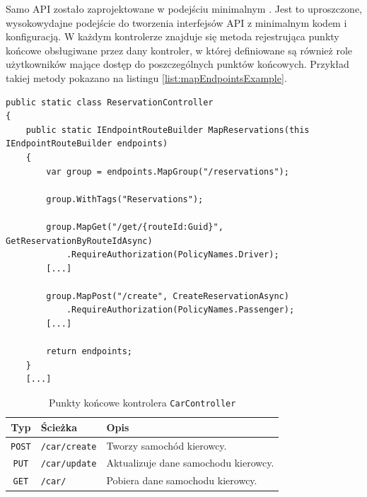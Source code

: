 Samo API zostało zaprojektowane w podejściu minimalnym \cite{MS_APIS}. 
Jest to uproszczone, wysokowydajne podejście do tworzenia interfejsów API z minimalnym kodem i konfiguracją.
W każdym kontrolerze znajduje się metoda rejestrująca punkty końcowe obsługiwane przez dany kontroler, w której definiowane są również role użytkowników mające dostęp do poszczególnych punktów końcowych.
Przykład takiej metody pokazano na listingu \ref{list:mapEndpointsExample}.

\begin{lstlisting}[label=list:mapEndpointsExample,caption=Przykład rejestracji punktów końcowych,style=sharpcstyle]
public static class ReservationController
{
    public static IEndpointRouteBuilder MapReservations(this IEndpointRouteBuilder endpoints)
    {
        var group = endpoints.MapGroup("/reservations");
        
        group.WithTags("Reservations");

        group.MapGet("/get/{routeId:Guid}", GetReservationByRouteIdAsync)
            .RequireAuthorization(PolicyNames.Driver);
        [...]

        group.MapPost("/create", CreateReservationAsync)
            .RequireAuthorization(PolicyNames.Passenger);
        [...]
        
        return endpoints;
    }
    [...]
\end{lstlisting}

\begin{table}[htb]
\small
\centering
\caption{Punkty końcowe kontrolera \texttt{CarController}}
\label{tab:endpoints-car}
\begin{tabularx}{\linewidth}{|c|X|X|} \hline
Typ & Ścieżka & Opis \\ \hline\hline
\texttt{POST} & \texttt{/car/create} & Tworzy samochód kierowcy. \\ \hline
\texttt{PUT} & \texttt{/car/update} & Aktualizuje dane samochodu kierowcy. \\ \hline
\texttt{GET} & \texttt{/car/} & Pobiera dane samochodu kierowcy. \\ \hline
\end{tabularx}
\end{table}

